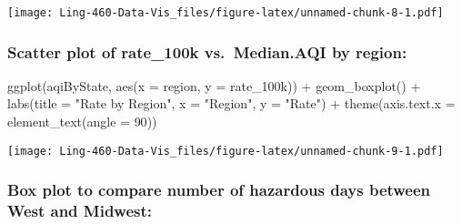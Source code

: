 \documentclass[
]{article}
\newenvironment{Shaded}{\begin{snugshade}}{\end{snugshade}}
\newcommand{\AttributeTok}[1]{\textcolor[rgb]{0.77,0.63,0.00}{#1}}
\newcommand{\DecValTok}[1]{\textcolor[rgb]{0.00,0.00,0.81}{#1}}
\newcommand{\FunctionTok}[1]{\textcolor[rgb]{0.00,0.00,0.00}{#1}}
\newcommand{\NormalTok}[1]{#1}
\newcommand{\SpecialCharTok}[1]{\textcolor[rgb]{0.00,0.00,0.00}{#1}}
\newcommand{\StringTok}[1]{\textcolor[rgb]{0.31,0.60,0.02}{#1}}
\begin{document}
\texttt{[image: Ling-460-Data-Vis\_files/figure-latex/unnamed-chunk-8-1.pdf]}

\hypertarget{scatter-plot-of-rate_100k-vs.-median.aqi-by-region}{%
\subsubsection{Scatter plot of rate\_100k vs.~Median.AQI by
region:}\label{scatter-plot-of-rate_100k-vs.-median.aqi-by-region}}

\begin{Shaded}
\begin{Highlighting}[]
\FunctionTok{ggplot}\NormalTok{(aqiByState, }\FunctionTok{aes}\NormalTok{(}\AttributeTok{x =}\NormalTok{ region, }\AttributeTok{y =}\NormalTok{ rate\_100k)) }\SpecialCharTok{+}
  \FunctionTok{geom\_boxplot}\NormalTok{() }\SpecialCharTok{+}
  \FunctionTok{labs}\NormalTok{(}\AttributeTok{title =} \StringTok{"Rate by Region"}\NormalTok{,}
       \AttributeTok{x =} \StringTok{"Region"}\NormalTok{, }\AttributeTok{y =} \StringTok{"Rate"}\NormalTok{) }\SpecialCharTok{+}
  \FunctionTok{theme}\NormalTok{(}\AttributeTok{axis.text.x =} \FunctionTok{element\_text}\NormalTok{(}\AttributeTok{angle =} \DecValTok{90}\NormalTok{))}
\end{Highlighting}
\end{Shaded}

\texttt{[image: Ling-460-Data-Vis\_files/figure-latex/unnamed-chunk-9-1.pdf]}

\hypertarget{box-plot-to-compare-number-of-hazardous-days-between-west-and-midwest}{%
\subsubsection{Box plot to compare number of hazardous days between West
and
Midwest:}\label{box-plot-to-compare-number-of-hazardous-days-between-west-and-midwest}}

\begin{Shaded}
\end{Shaded}
\end{document}
